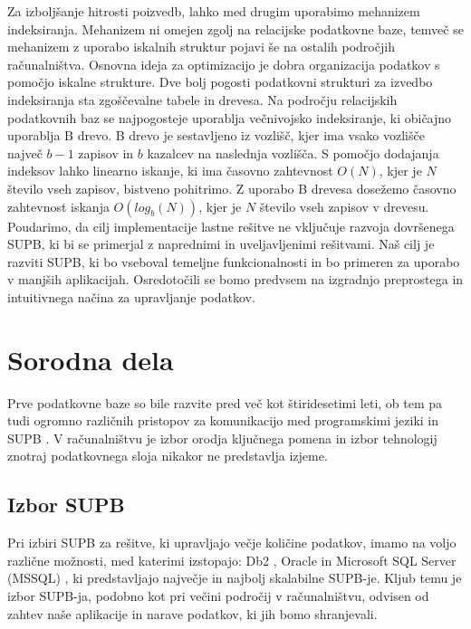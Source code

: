 \documentclass[a4paper,12pt,openright]{book}
\begin{document}
    Za izboljšanje hitrosti poizvedb, lahko med drugim uporabimo mehanizem indeksiranja. Mehanizem ni omejen zgolj na relacijske podatkovne baze, temveč se mehanizem z uporabo iskalnih struktur pojavi še na ostalih področjih računalništva. Osnovna ideja za optimizacijo je dobra organizacija podatkov s pomočjo iskalne strukture. Dve bolj pogosti podatkovni strukturi za izvedbo indeksiranja sta zgoščevalne tabele in drevesa. Na področju relacijskih podatkovnih baz se najpogosteje uporablja večnivojsko indeksiranje, ki običajno uporablja B drevo. B drevo je sestavljeno iz vozlišč, kjer ima vsako vozlišče največ $b - 1$ zapisov in $b$ kazalcev na naslednja vozlišča. S pomočjo dodajanja indeksov lahko linearno iskanje, ki ima časovno zahtevnost $O(N)$, kjer je $N$ število vseh zapisov, bistveno pohitrimo. Z uporabo B drevesa dosežemo časovno zahtevnost iskanja $O(log_b(N))$, kjer je $N$ število vseh zapisov v drevesu.
    \newline
    \newline
    \noindent
    Poudarimo, da cilj implementacije lastne rešitve ne vključuje razvoja dovrše\-nega SUPB, ki bi se primerjal z naprednimi in uveljavljenimi rešitvami. Naš cilj je razviti SUPB, ki bo vseboval temeljne funkcionalnosti in bo primeren za uporabo v manjših aplikacijah. Osredotočili se bomo predvsem na izgradnjo preprostega in intuitivnega načina za upravljanje podatkov.

\chapter{Sorodna dela}

    Prve podatkovne baze so bile razvite pred več kot štiridesetimi leti, ob tem pa tudi ogromno različnih pristopov za komunikacijo med programskimi jeziki in SUPB \cite{bachman-09}. V računalništvu je izbor orodja ključnega pomena in izbor tehnologij znotraj podatkovnega sloja nikakor ne predstavlja izjeme.

    \section{Izbor SUPB}
    Pri izbiri SUPB za rešitve, ki upravljajo večje količine podatkov, imamo na voljo različne možnosti, med katerimi izstopajo: Db2 \cite{DB2}, Oracle \cite{ORACLE} in Microsoft SQL Server (MSSQL) \cite{MSSQL}, ki predstavljajo največje in najbolj skalabilne SUPB-je. Kljub temu je izbor SUPB-ja, podobno kot pri večini področij v računalništvu, odvisen od zahtev naše aplikacije in narave podatkov, ki jih bomo shranjevali.
\end{document}
